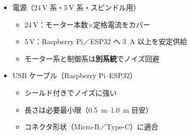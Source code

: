 \documentclass[uplatex,dvipdfmx]{ujarticle}
\begin{document}
\begin{itemize}
\begin{itemize}
      \item \SIrange{200}{400}{\watt} 以上を目安
    \end{itemize}
  \item 電源（24\,V 系・5\,V 系・スピンドル用）
    \begin{itemize}
      \item 24\,V：モーター本数×定格電流をカバー
      \item 5\,V：Raspberry Pi／ESP32 へ \SI{3}{\ampere} 以上を安定供給
      \item モーター系と制御系は\textbf{別系統}でノイズ回避
    \end{itemize}
  \item USB ケーブル（Raspberry Pi--ESP32）
    \begin{itemize}
      \item シールド付きでノイズに強い
      \item 長さは必要最小限（\SIrange{0.5}{1.0}{\meter} 目安）
      \item コネクタ形状（Micro-B／Type-C）に適合
    \end{itemize}
\end{itemize}


\end{document}
